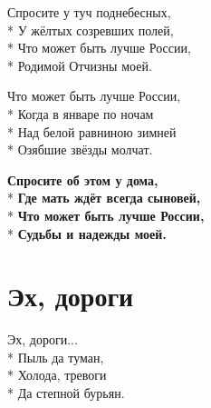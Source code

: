 \medskip

\begin{minipage}{\linewidth}
Спросите у туч поднебесных,\\*
У жёлтых созревших полей,\\*
Что может быть лучше России,\\*
Родимой Отчизны моей. \\
\end{minipage}\par\medskip\nobreak

\medskip

\begin{minipage}{\linewidth}
Что может быть лучше России,\\*
Когда в январе по ночам\\*
Над белой равниною зимней\\*
Озябшие звёзды молчат. \\
\end{minipage}\par\medskip\nobreak

\medskip

\begin{minipage}{\linewidth}
\textbf{Спросите об этом у дома,}\\*
\textbf{Где мать ждёт всегда сыновей,}\\*
\textbf{Что может быть лучше России,}\\*
\textbf{Судьбы и надежды моей. }\\
\end{minipage}

\vspace{\fill}\newpage

\section{Эх, дороги}
\label{song:Эх,_дороги}

\medskip

\begin{minipage}{\linewidth}
\hspace*{1.5em}Эх, дороги...\\*
\hspace*{1.5em}Пыль да туман,\\*
\hspace*{1.5em}Холода, тревоги\\*
\hspace*{1.5em}Да степной бурьян.\\
\end{minipage}\par\medskip\nobreak

